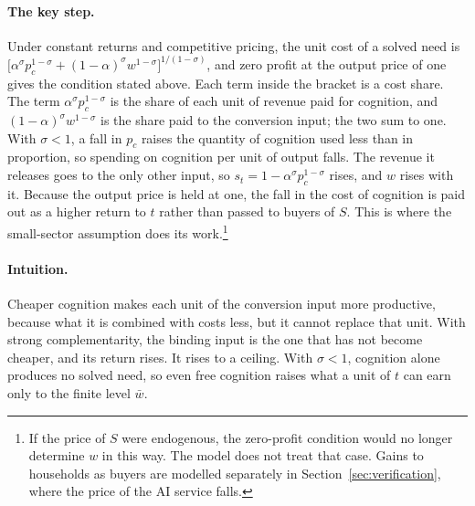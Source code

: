\documentclass[12pt]{article}
\theoremstyle{remark}
\begin{document}
\paragraph{The key step.} Under constant returns and competitive pricing, the unit cost of a solved need is $\big[\alpha^\sigma p_c^{1-\sigma}+(1-\alpha)^\sigma w^{1-\sigma}\big]^{1/(1-\sigma)}$, and zero profit at the output price of one gives the condition stated above. Each term inside the bracket is a cost share. The term $\alpha^\sigma p_c^{1-\sigma}$ is the share of each unit of revenue paid for cognition, and $(1-\alpha)^\sigma w^{1-\sigma}$ is the share paid to the conversion input; the two sum to one. With $\sigma<1$, a fall in $p_c$ raises the quantity of cognition used less than in proportion, so spending on cognition per unit of output falls. The revenue it releases goes to the only other input, so $s_t=1-\alpha^\sigma p_c^{1-\sigma}$ rises, and $w$ rises with it. Because the output price is held at one, the fall in the cost of cognition is paid out as a higher return to $t$ rather than passed to buyers of $S$. This is where the small-sector assumption does its work.\footnote{If the price of $S$ were endogenous, the zero-profit condition would no longer determine $w$ in this way. The model does not treat that case. Gains to households as buyers are modelled separately in Section~\ref{sec:verification}, where the price of the AI service falls.}

\paragraph{Intuition.} Cheaper cognition makes each unit of the conversion input more productive, because what it is combined with costs less, but it cannot replace that unit. With strong complementarity, the binding input is the one that has not become cheaper, and its return rises. It rises to a ceiling. With $\sigma<1$, cognition alone produces no solved need, so even free cognition raises what a unit of $t$ can earn only to the finite level $\bar w$.
\end{document}

